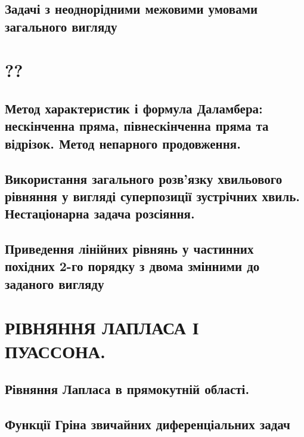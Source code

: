 \documentclass[a4paper, 14pt]{extreport}
\begin{document}
\chapter{Задачі з неоднорідними межовими умовами загального вигляду}




\part{??}
\chapter{Метод характеристик і формула Даламбера: нескінченна пряма, півнескінченна пряма та відрізок. Метод непарного продовження.}




\chapter{Використання загального розв’язку хвильового рівняння у вигляді суперпозиції зустрічних хвиль. Нестаціонарна задача розсіяння.}



\chapter{Приведення лінійних рівнянь у частинних похідних 2-го порядку з двома змінними до заданого вигляду}




\part{РІВНЯННЯ ЛАПЛАСА І ПУАССОНА.}

\chapter{Рівняння Лапласа в прямокутній області.}



\chapter{Функції Гріна звичайних диференціальних задач}



\end{document}
